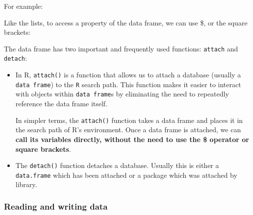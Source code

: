\documentclass[a4paper]{article}
\newcommand{\highspace}{\vspace{1.2em}\noindent}
\begin{document}
    \highspace
    For example:
    
    Like the lists, to access a property of the data frame, we can use \$, or the square brackets:
    
    The data frame has two important and frequently used functions: \texttt{attach} and \texttt{detach}:
    \begin{itemize}
        \item In R, \texttt{attach()} is a function that allows us to attach a database (usually a \texttt{data frame}) to the \texttt{R} search path. This function makes it easier to interact with objects within \texttt{data frame}s by eliminating the need to repeatedly reference the data frame itself.

        In simpler terms, the \texttt{attach()} function takes a data frame and places it in the search path of R's environment. Once a data frame is attached, we can \textbf{call its variables directly, without the need to use the \$ operator or square brackets}.
        

        \item The \texttt{detach()} function detaches a database. Usually this is either a \texttt{data.frame} which has been attached or a package which was attached by library.
        
    \end{itemize}

    \newpage

    \subsubsection{Reading and writing data}
\end{document}
